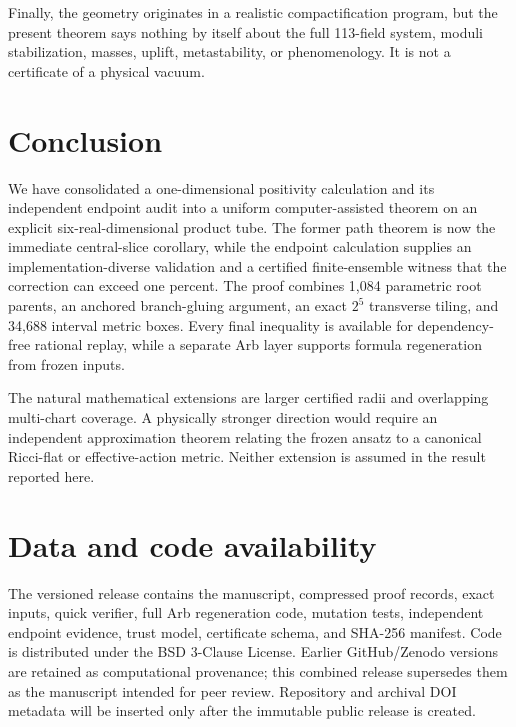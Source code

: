 \documentclass[11pt]{article}
\begin{document}
Finally, the geometry originates in a realistic compactification program, but
the present theorem says nothing by itself about the full 113-field system,
moduli stabilization, masses, uplift, metastability, or phenomenology.  It is
not a certificate of a physical vacuum.

\section{Conclusion}

We have consolidated a one-dimensional positivity calculation and its
independent endpoint audit into a uniform computer-assisted theorem on an
explicit six-real-dimensional product tube.  The former path theorem is now
the immediate central-slice corollary, while the endpoint calculation supplies
an implementation-diverse validation and a certified finite-ensemble witness
that the correction can exceed one percent.
The proof combines 1,084 parametric root parents, an anchored branch-gluing
argument, an exact $2^5$ transverse tiling, and 34,688 interval metric boxes.
Every final inequality is available for dependency-free rational replay, while
a separate Arb layer supports formula regeneration from frozen inputs.

The natural mathematical extensions are larger certified radii and overlapping
multi-chart coverage.  A physically stronger direction would require an
independent approximation theorem relating the frozen ansatz to a canonical
Ricci-flat or effective-action metric.  Neither extension is assumed in the
result reported here.

\section*{Data and code availability}

The versioned release contains the manuscript, compressed proof records,
exact inputs, quick verifier, full Arb regeneration code, mutation tests,
independent endpoint evidence, trust model, certificate schema, and SHA-256
manifest.  Code is distributed under the BSD 3-Clause License.  Earlier
GitHub/Zenodo versions are retained as computational provenance; this combined
release supersedes them as the manuscript intended for peer review.  Repository
and archival DOI metadata will be inserted only after the immutable public
release is created.



\end{document}
